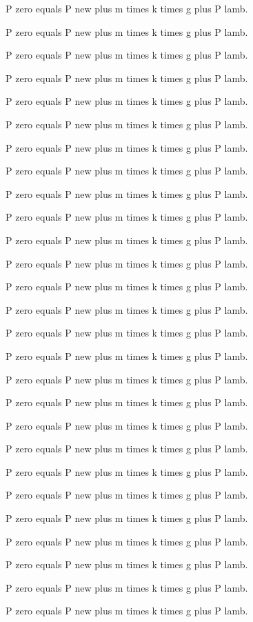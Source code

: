 P zero equals P new plus m times k times g plus P lamb. 

P zero equals P new plus m times k times g plus P lamb. 

P zero equals P new plus m times k times g plus P lamb. 

P zero equals P new plus m times k times g plus P lamb. 

P zero equals P new plus m times k times g plus P lamb. 

P zero equals P new plus m times k times g plus P lamb. 

P zero equals P new plus m times k times g plus P lamb. 

P zero equals P new plus m times k times g plus P lamb. 

P zero equals P new plus m times k times g plus P lamb. 

P zero equals P new plus m times k times g plus P lamb. 

P zero equals P new plus m times k times g plus P lamb. 

P zero equals P new plus m times k times g plus P lamb. 

P zero equals P new plus m times k times g plus P lamb. 

P zero equals P new plus m times k times g plus P lamb. 

P zero equals P new plus m times k times g plus P lamb. 

P zero equals P new plus m times k times g plus P lamb. 

P zero equals P new plus m times k times g plus P lamb. 

P zero equals P new plus m times k times g plus P lamb. 

P zero equals P new plus m times k times g plus P lamb. 

P zero equals P new plus m times k times g plus P lamb. 

P zero equals P new plus m times k times g plus P lamb. 

P zero equals P new plus m times k times g plus P lamb. 

P zero equals P new plus m times k times g plus P lamb. 

P zero equals P new plus m times k times g plus P lamb. 

P zero equals P new plus m times k times g plus P lamb. 

P zero equals P new plus m times k times g plus P lamb. 

P zero equals P new plus m times k times g plus P lamb. 

